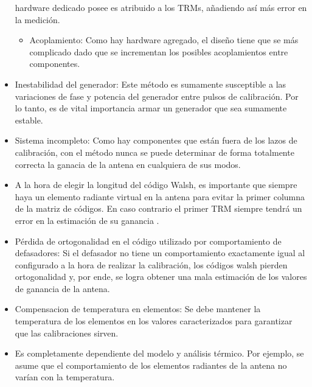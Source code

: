 \begin{itemize}
		hardware dedicado posee es atribuido a los TRMs, añadiendo así más error en la medición.
	\begin{itemize}
		\item Acoplamiento: Como hay hardware agregado, el diseño tiene que se más complicado dado que se incrementan los posibles
			acoplamientos entre componentes.
	\end{itemize}
	\item Inestabilidad del generador: Este método es sumamente susceptible a las variaciones de fase y potencia del generador
		entre pulsos de calibración. Por lo tanto, es de vital importancia armar un generador que sea sumamente estable.
	\item Sistema incompleto: Como hay componentes que están fuera de los lazos de calibración, con el método nunca se puede
		determinar de forma totalmente correcta la ganacia de la antena en cualquiera de sus modos.
	\item A la hora de elegir la longitud del código Walsh, es importante que siempre haya un elemento radiante virtual en la
		antena para evitar la primer columna de la matriz de códigos. En caso contrario el primer TRM siempre tendrá un error en
		la estimación de su ganancia \cite{Wang2010}.
	\item Pérdida de ortogonalidad en el código utilizado por comportamiento de defasadores: Si el defasador no tiene un
		comportamiento exactamente igual al configurado a la hora de realizar la calibración, los códigos walsh pierden
		ortogonalidad y, por ende, se logra obtener una mala estimación de los valores de ganancia de la antena.
    \item Compensacion de temperatura en elementos: Se debe mantener la temperatura de los elementos en los valores
        caracterizados para garantizar que las calibraciones sirven.
    \item Es completamente dependiente del modelo y análisis térmico. Por ejemplo, se asume que el comportamiento de los
        elementos radiantes de la antena no varían con la temperatura.
\end{itemize}
